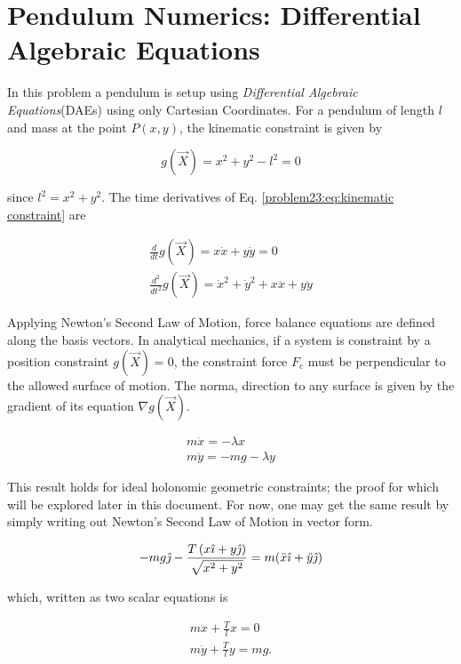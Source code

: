 \section{Pendulum Numerics: Differential Algebraic Equations}

In this problem a pendulum is setup using \textit{Differential Algebraic Equations}(DAEs) using only Cartesian Coordinates. For a pendulum of length $l$ and mass at the point $P(x,y)$, the kinematic constraint is given by

\begin{equation}
    g(\vec{X}) = x^2 + y^2 - l^2 = 0
    \label{problem23:eq:kinematic constraint}
\end{equation}

since $l^2 = x^2 + y^2$. The time derivatives of Eq. \ref{problem23:eq:kinematic constraint} are

\begin{align}
    \frac{d}{dt}g(\vec{X}) = x\dot{x} + y\dot{y} = 0 \\
    \frac{d^2}{dt^2}g(\vec{X}) = \dot{x}^2 + \dot{y}^2 + x\ddot{x} + y\ddot{y}
\end{align}

Applying Newton's Second Law of Motion, force balance equations are defined along the basis vectors. In analytical mechanics, if a system is constraint by a position constraint $g(\vec{X}) = 0$, the constraint force $F_c$ must be perpendicular to the allowed surface of motion. The norma, direction to any surface is given by the gradient of its equation $\nabla g(\vec{X})$.

\begin{align}
    m\ddot{x} = -\lambda x \\
    m\ddot{y} = -mg - \lambda y
\end{align}

This result holds for ideal holonomic geometric constraints; the proof for which will be explored later in this document. For now, one may get the same result by simply writing out Newton's Second Law of Motion in vector form.

\begin{equation}
    -mg \hat{\jmath} - \frac{T \left(x\hat{\imath} + y\hat{\jmath}\right)}{\sqrt{x^2 + y^2}} =
    m(\ddot{x} \hat{\imath} + \ddot{y} \hat{\jmath})
\end{equation}

which, written as two scalar equations is

\begin{align}
    m\ddot{x} + \frac{T}{l}x = 0 \\
    m\ddot{y} + \frac{T}{l}y = mg.
\end{align}

